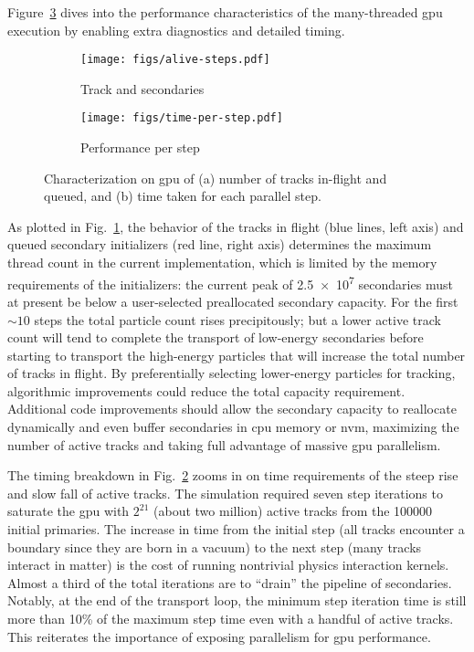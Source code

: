 Figure~\ref{fig:celeritas-steps} dives into the performance characteristics of
the many-threaded \ac{gpu} execution by enabling extra diagnostics and detailed
timing.
\begin{figure}
    \centering%
    \begin{subfigure}{\textwidth/2}%
      \texttt{[image: figs/alive-steps.pdf]}%
      \caption{Track and secondaries}%
      \label{fig:gpu-thread-active}%
    \end{subfigure}%
    \begin{subfigure}{\textwidth/2}%
      \texttt{[image: figs/time-per-step.pdf]}%
      \caption{Performance per step}%
      \label{fig:gpu-thread-time}%
    \end{subfigure}%
    \caption{Characterization on \acs{gpu} of (a) number of tracks in-flight and
    queued, and (b) time taken for each parallel step.}%
    \label{fig:celeritas-steps}%
\end{figure}
As plotted in Fig.~\ref{fig:gpu-thread-active}, the behavior of the tracks in
flight (blue lines, left axis) and queued secondary initializers (red line,
right axis) determines the maximum thread count in the current implementation,
which is limited by the memory requirements of the initializers: the current
peak of \num{2.5e7} secondaries must at present be below a user-selected
preallocated secondary capacity. For the first ${\sim}10$ steps the total
particle count rises precipitously; but a lower active track count will tend to
complete the transport of low-energy secondaries before starting to transport
the high-energy particles that will increase the total number of tracks in
flight. By preferentially selecting lower-energy particles for tracking,
algorithmic improvements could reduce the total capacity requirement. Additional
code improvements should allow the secondary capacity to reallocate dynamically
and even buffer secondaries in \ac{cpu} memory or \ac{nvm}, maximizing the
number of active tracks and taking full advantage of massive \ac{gpu}
parallelism.

The timing breakdown in Fig.~\ref{fig:gpu-thread-time} zooms in on time
requirements of the steep rise and slow fall of active tracks. The simulation
required seven step iterations to saturate the \ac{gpu} with $2^{21}$ (about two
million) active tracks from the \num{100000} initial primaries. The increase in
time from the initial step (all tracks encounter a boundary since they are born
in a vacuum) to the next step (many tracks interact in matter) is the cost of
running nontrivial physics interaction kernels. Almost a third of the total
iterations are to ``drain'' the pipeline of secondaries. Notably, at the end of
the transport loop, the minimum step iteration time is still more than 10\% of
the maximum step time even with a handful of active tracks. This reiterates the
importance of exposing parallelism for \ac{gpu} performance.

